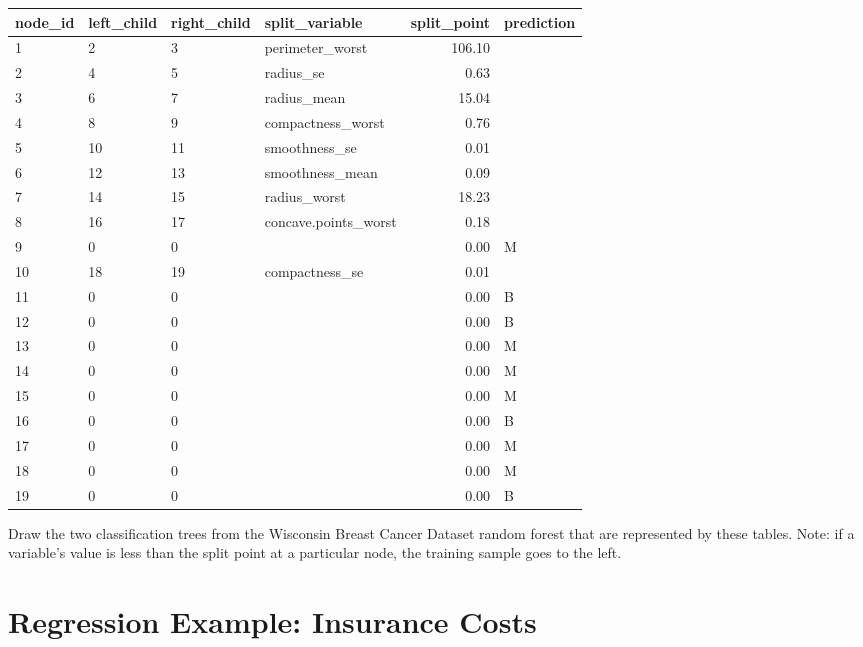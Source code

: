 \begin{center}
{\begin{tabular}{llllrl}
  \hline
 node\_id & left\_child & right\_child & split\_variable & split\_point & prediction \\ 
  \hline
1 & 2 & 3 & perimeter\_worst & 106.10 &  \\ 
  2 & 4 & 5 & radius\_se & 0.63 &  \\ 
  3 & 6 & 7 & radius\_mean & 15.04 &  \\ 
  4 & 8 & 9 & compactness\_worst & 0.76 &  \\ 
  5 & 10 & 11 & smoothness\_se & 0.01 &  \\ 
  6 & 12 & 13 & smoothness\_mean & 0.09 &  \\ 
  7 & 14 & 15 & radius\_worst & 18.23 &  \\ 
  8 & 16 & 17 & concave.points\_worst & 0.18 &  \\ 
  9 & 0 & 0 &  & 0.00 & M \\ 
  10 & 18 & 19 & compactness\_se & 0.01 &  \\ 
  11 & 0 & 0 &  & 0.00 & B \\ 
  12 & 0 & 0 &  & 0.00 & B \\ 
  13 & 0 & 0 &  & 0.00 & M \\ 
  14 & 0 & 0 &  & 0.00 & M \\ 
  15 & 0 & 0 &  & 0.00 & M \\ 
  16 & 0 & 0 &  & 0.00 & B \\ 
  17 & 0 & 0 &  & 0.00 & M \\ 
  18 & 0 & 0 &  & 0.00 & M \\ 
  19 & 0 & 0 &  & 0.00 & B \\ 
   \hline
\end{tabular}
}
\end{center}

\vspace{3mm}

\begin{question}{}
Draw the two classification trees from the Wisconsin Breast Cancer Dataset random forest that are represented by these tables. Note: if a variable's value is less than the split point at a particular node, the training sample goes to the left. 
\end{question}


\section{Regression Example: Insurance Costs \label{sect:reginsurance}}

